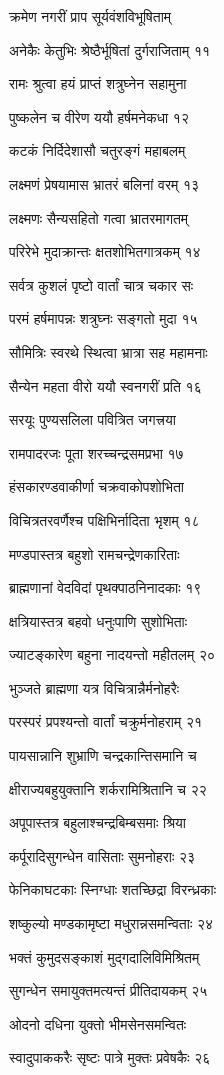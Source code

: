 क्रमेण नगरीं प्राप सूर्यवंशविभूषिताम्

अनेकैः केतुभिः श्रेष्ठैर्भूषितां दुर्गराजिताम् ११

रामः श्रुत्वा हयं प्राप्तं शत्रुघ्नेन सहामुना

पुष्कलेन च वीरेण ययौ हर्षमनेकधा १२

कटकं निर्दिदेशासौ चतुरङ्गं महाबलम्

लक्ष्मणं प्रेषयामास भ्रातरं बलिनां वरम् १३

लक्ष्मणः सैन्यसहितो गत्वा भ्रातरमागतम्

परिरेभे मुदाक्रान्तः क्षतशोभितगात्रकम् १४

सर्वत्र कुशलं पृष्टो वार्तां चात्र चकार सः

परमं हर्षमापन्नः शत्रुघ्नः सङ्गतो मुदा १५

सौमित्रिः स्वरथे स्थित्वा भ्रात्रा सह महामनाः

सैन्येन महता वीरो ययौ स्वनगरीं प्रति १६

सरयूः पुण्यसलिला पवित्रित जगत्त्रया

रामपादरजः पूता शरच्चन्द्रसमप्रभा १७

हंसकारण्डवाकीर्णा चक्रवाकोपशोभिता

विचित्रतरवर्णैश्च पक्षिभिर्नादिता भृशम् १८

मण्डपास्तत्र बहुशो रामचन्द्रेणकारिताः

ब्राह्मणानां वेदविदां पृथक्पाठनिनादकाः १९

क्षत्रियास्तत्र बहवो धनुःपाणि सुशोभिताः

ज्याटङ्कारेण बहुना नादयन्तो महीतलम् २०

भुञ्जते ब्राह्मणा यत्र विचित्रान्नैर्मनोहरैः

परस्परं प्रपश्यन्तो वार्तां चक्रुर्मनोहराम् २१

पायसान्नानि शुभ्राणि चन्द्रकान्तिसमानि च

क्षीराज्यबहुयुक्तानि शर्करामिश्रितानि च २२

अपूपास्तत्र बहुलाश्चन्द्रबिम्बसमाः श्रिया

कर्पूरादिसुगन्धेन वासिताः सुमनोहराः २३

फेनिकाघटकाः स्निग्धाः शतच्छिद्रा विरन्ध्रकाः

शष्कुल्यो मण्डकामृष्टा मधुरान्नसमन्विताः २४

भक्तं कुमुदसङ्काशं मुद्गदालिविमिश्रितम्

सुगन्धेन समायुक्तमत्यन्तं प्रीतिदायकम् २५

ओदनो दधिना युक्तो भीमसेनसमन्वितः

स्वादुपाककरैः सृष्टः पात्रे मुक्तः प्रवेषकैः २६

